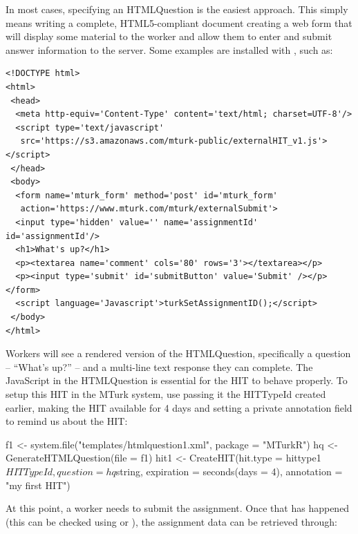 In most cases, specifying an HTMLQuestion is the easiest approach. This simply means writing a complete, HTML5-compliant document creating a web form that will display some material to the worker and allow them to enter and submit answer information to the server. Some examples are installed with , such as:

\begin{verbatim}
<!DOCTYPE html>
<html>
 <head>
  <meta http-equiv='Content-Type' content='text/html; charset=UTF-8'/>
  <script type='text/javascript' 
   src='https://s3.amazonaws.com/mturk-public/externalHIT_v1.js'></script>
 </head>
 <body>
  <form name='mturk_form' method='post' id='mturk_form' 
   action='https://www.mturk.com/mturk/externalSubmit'>
  <input type='hidden' value='' name='assignmentId' id='assignmentId'/>
  <h1>What's up?</h1>
  <p><textarea name='comment' cols='80' rows='3'></textarea></p>
  <p><input type='submit' id='submitButton' value='Submit' /></p></form>
  <script language='Javascript'>turkSetAssignmentID();</script>
 </body>
</html>
\end{verbatim}

\noindent Workers will see a rendered version of the HTMLQuestion, specifically a question -- ``What's up?'' -- and a multi-line text response they can complete. The JavaScript in the HTMLQuestion is essential for the HIT to behave properly. To setup this HIT in the MTurk system, use  passing it the HITTypeId created earlier, making the HIT available for 4 days and setting a private annotation field to remind us about the HIT:

\begin{example}
f1 <- system.file("templates/htmlquestion1.xml", package = "MTurkR")
hq <- GenerateHTMLQuestion(file = f1)
hit1 <- CreateHIT(hit.type = hittype1$HITTypeId, 
                  question = hq$string,
                  expiration = seconds(days = 4),
                  annotation = "my first HIT")
\end{example}

At this point, a worker needs to submit the assignment. Once that has happened (this can be checked using  or ), the assignment data can be retrieved through:


